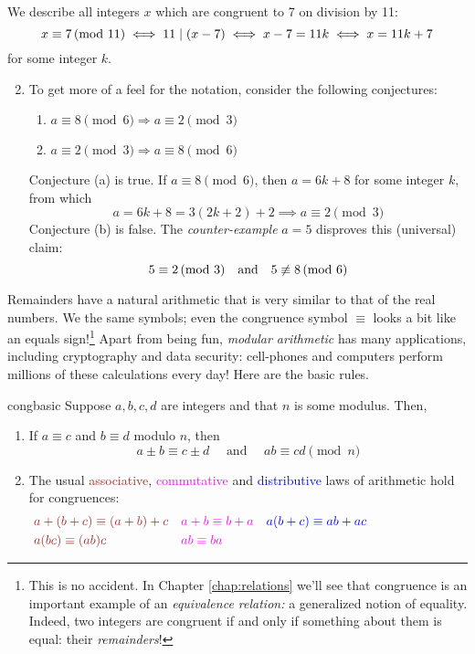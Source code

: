 \goodbreak


\begin{examples}{}{}
\exstart We describe all integers $x$ which are congruent to 7 on division by 11:
	\[
		x\equiv 7\negthickspace\pmod{11}\iff 11\mid(x-7) \iff x-7=11k\iff x=11k+7
	\]
	for some integer $k$.
	\goodbreak

\begin{enumerate}\setcounter{enumi}{1}
  \item To get more of a feel for the notation, consider the following conjectures:
	\begin{enumerate}
	    \item $a\equiv 8\pmod 6\Longrightarrow a\equiv 2\pmod 3$
	    \item $a\equiv 2\pmod 3\Longrightarrow a\equiv 8\pmod 6$
	\end{enumerate}
	Conjecture (a) is true. If $a\equiv 8\pmod 6$, then $a=6k+8$ for some integer $k$, from which
		\[
			a=6k+8 =3(2k+2)+2 \implies a\equiv 2\pmod 3
		\]
		Conjecture (b) is false. The \emph{counter-example} $a=5$ disproves this (universal) claim:
		\[
			5\equiv 2\negthickspace\pmod{3} \quad\text{and}\quad 5\not\equiv 8\negthickspace\pmod{6}
		\]
	\end{enumerate}
\end{examples}




Remainders have a natural arithmetic that is very similar to that of the real numbers. We the same symbols; even the congruence symbol $\equiv$ looks a bit like an equals sign!\footnote{This is no accident. In Chapter \ref{chap:relations} we'll see that congruence is an important example of an \emph{equivalence relation:} a generalized notion of equality. Indeed, two integers are congruent if and only if something about them is equal: their \emph{remainders}!} Apart from being fun, \emph{modular arithmetic} has many applications, including cryptography and data security: cell-phones and computers perform millions of these calculations every day! Here are the basic rules.

\begin{thm}{}{congbasic}
	Suppose $a,b,c,d$ are integers and that $n$ is some modulus. Then,
	\begin{enumerate}
	  \item If $a\equiv c$ and $b\equiv d$ modulo $n$, then
	  \[
	  	a\pm b\equiv c\pm d\quad\text{ and }\quad ab\equiv cd \pmod n
	  \]
	  \item The usual \textcolor{Brown}{associative}, \textcolor{Magenta}{commutative} and \textcolor{blue}{distributive} laws of arithmetic hold for congruences:
		\begin{align*}
			&\textcolor{Brown}{a+(b+c)\equiv (a+b)+c}
			&&\textcolor{Magenta}{a+b\equiv b+a}
			&&\textcolor{blue}{a(b+c)\equiv ab+ac} \hspace{75pt}\\
			&\textcolor{Brown}{a(bc)\equiv (ab)c}
			&&\textcolor{Magenta}{ab\equiv ba}
		\end{align*}
	\end{enumerate}
\end{thm}

